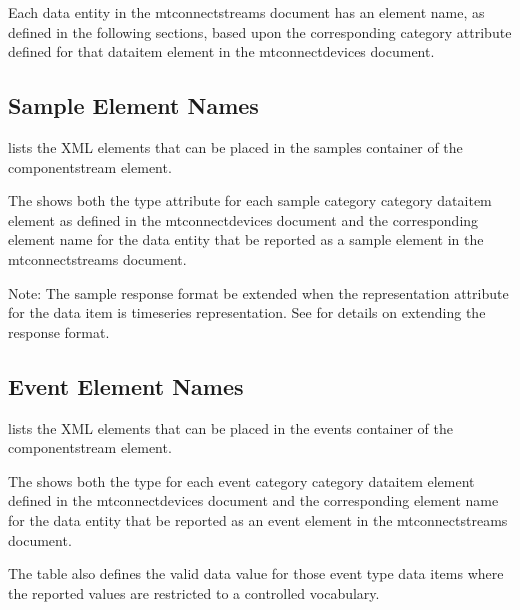 Each \gls{data entity} in the \gls{mtconnectstreams} document has an \gls{element name}, as defined in the following sections, based upon the corresponding \gls{category} attribute defined for that \gls{dataitem} element in the \gls{mtconnectdevices} document.

\subsection{Sample Element Names}\label{sec:Sample Element Names}

 lists the XML elements that can be placed in the \gls{samples} container of the \gls{componentstream} element.

The  shows both the \gls{type} attribute for each \gls{sample category} category \gls{dataitem} element as defined in the \gls{mtconnectdevices} document and the corresponding \gls{element name} for the \gls{data entity} that \must be reported as a \gls{sample} element in the \gls{mtconnectstreams} document. 



\begin{note}
Note: The \gls{sample} response format \must be extended when the \gls{representation} attribute for the data item is \gls{timeseries representation}.  See  for details on extending the response format.

\end{note}

\subsection{Event Element Names}
\label{sec:Event Element Names}

 lists the XML elements that can be placed in the \gls{events} container of the \gls{componentstream} element.

The  shows both the \gls{type} for each \gls{event category} category \gls{dataitem} element defined in the \gls{mtconnectdevices} document and the corresponding \gls{element name} for the \gls{data entity} that \must be reported as an \gls{event} element in the \gls{mtconnectstreams} document.

The table also defines the \gls{valid data value} for those \gls{event} \gls{type} data items where the reported values are restricted to a \gls{controlled vocabulary}.

